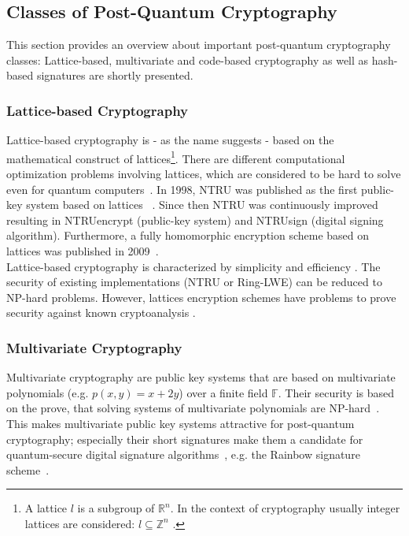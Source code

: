 \subsection{Classes of Post-Quantum Cryptography} \label{sec:classes_pqc}

This section provides an overview about important post-quantum cryptography classes: Lattice-based, multivariate and code-based cryptography as well as hash-based signatures are shortly presented. 

\subsubsection{Lattice-based Cryptography}
Lattice-based cryptography is - as the name suggests - based on the mathematical construct of lattices\footnote{A lattice $l$ is a subgroup of $\mathbb{R}^n$. In the context of cryptography usually integer lattices are considered: $l \subseteq \mathbb{Z}^n$ \parencite{chi2015lattice}.}. There are different computational optimization problems involving lattices, which are considered to be hard to solve even for quantum computers~\parencite{chi2015lattice}. In 1998, NTRU was published as the first public-key system based on lattices ~\parencite{hoffstein1998ntru}. Since then NTRU was continuously improved resulting in NTRUencrypt (public-key system) and NTRUsign (digital signing algorithm). Furthermore, a fully homomorphic encryption scheme based on lattices was published in 2009~\parencite{gentry2009fully}.\\
Lattice-based cryptography is characterized by simplicity and efficiency \parencite{chen2016report}. The security of existing implementations (NTRU or Ring-LWE) can be reduced to NP-hard problems. However, lattices encryption schemes have problems to prove security against known cryptoanalysis \parencite{chen2016report}.
\subsubsection{Multivariate Cryptography}
Multivariate cryptography are public key systems that are based on multivariate polynomials (e.g. $p(x,y)=x+2y$) over a finite field $\mathbb{F}$. Their security is based on the prove, that solving systems of multivariate polynomials are NP-hard~\parencite{hartmanis1982computers}. This makes multivariate public key systems attractive for post-quantum cryptography; especially their short signatures make them a candidate for quantum-secure digital signature algorithms~\parencite{ding2017current}, e.g. the Rainbow signature scheme~\parencite{ding2005rainbow}.
